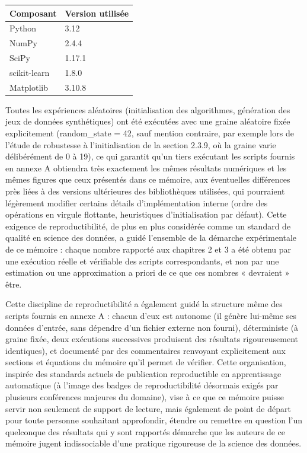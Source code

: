 \begin{table}[H]
\centering
\small
\setlength{\tabcolsep}{0.14cm}
\begin{tabular}{|p{7.42cm}|p{7.42cm}|}
\hline
\textbf{Composant} & \textbf{Version utilisée} \\
\hline
Python & 3.12 \\
\hline
NumPy & 2.4.4 \\
\hline
SciPy & 1.17.1 \\
\hline
scikit-learn & 1.8.0 \\
\hline
Matplotlib & 3.10.8 \\
\hline
\end{tabular}
\end{table}
Toutes les expériences aléatoires (initialisation des algorithmes, génération des jeux de données synthétiques) ont été exécutées avec une graine aléatoire fixée explicitement (random\_state = 42, sauf mention contraire, par exemple lors de l'étude de robustesse à l'initialisation de la section 2.3.9, où la graine varie délibérément de 0 à 19), ce qui garantit qu'un tiers exécutant les scripts fournis en annexe A obtiendra très exactement les mêmes résultats numériques et les mêmes figures que ceux présentés dans ce mémoire, aux éventuelles différences près liées à des versions ultérieures des bibliothèques utilisées, qui pourraient légèrement modifier certains détails d'implémentation interne (ordre des opérations en virgule flottante, heuristiques d'initialisation par défaut). Cette exigence de reproductibilité, de plus en plus considérée comme un standard de qualité en science des données, a guidé l'ensemble de la démarche expérimentale de ce mémoire : chaque nombre rapporté aux chapitres 2 et 3 a été obtenu par une exécution réelle et vérifiable des scripts correspondants, et non par une estimation ou une approximation a priori de ce que ces nombres « devraient » être.

Cette discipline de reproductibilité a également guidé la structure même des scripts fournis en annexe A : chacun d'eux est autonome (il génère lui-même ses données d'entrée, sans dépendre d'un fichier externe non fourni), déterministe (à graine fixée, deux exécutions successives produisent des résultats rigoureusement identiques), et documenté par des commentaires renvoyant explicitement aux sections et équations du mémoire qu'il permet de vérifier. Cette organisation, inspirée des standards actuels de publication reproductible en apprentissage automatique (à l'image des badges de reproductibilité désormais exigés par plusieurs conférences majeures du domaine), vise à ce que ce mémoire puisse servir non seulement de support de lecture, mais également de point de départ pour toute personne souhaitant approfondir, étendre ou remettre en question l'un quelconque des résultats qui y sont rapportés  démarche que les auteurs de ce mémoire jugent indissociable d'une pratique rigoureuse de la science des données.

